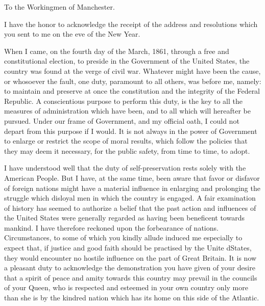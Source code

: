 \documentclass[12pt]{letter}
\date{Executive Mansion, \\ 
	Washington, January, 19, 1863.}
\begin{document}
\begin{letter}{}
\opening{To the Workingmen of Manchester.}

 \marginpar{\textbf{[1]}} I have the honor to acknowledge the receipt of the address and resolutions which you sent to me on the eve of the New Year.

When I came, on the fourth day of the March, 1861, through a free and constitutional election, to preside in the Government of the United States, the country was found at the verge of civil war. Whatever might have been the cause, or whosoever the fault, one duty, paramount to all others, was before me, namely: to maintain and preserve at once the constitution and the integrity of the Federal Republic. A conscientious purpose to perform this duty, is the key to all the measures of administration \marginpar{\textbf{[2]}} which have been, and to all which will hereafter be pursued. Under our frame of Government, and my official oath, I could not depart from this purpose if I would. It is not always in the power of Government to enlarge or restrict the scope of moral results, which follow the policies that they may deem it necessary, for the public safety, from time to time, to adopt.

I have understood well that the duty of self-preservation rests solely with the American People. But I have, at the same time, been aware that favor or disfavor of foreign nations might have a material influence in enlarging and prolonging the struggle which disloyal men in which the country is engaged. A fair examination of history has seemed to authorize a belief that the past action and influences of the United States were generally regarded as having been beneficent towards mankind. I have therefore reckoned upon the forbearance of nations. Circumstances, to some of which you \marginpar{\textbf{[3]}} kindly allude induced me especially to expect that, if justice and good faith should be practised by the Unite dStates, they would encounter no hostile influence on the part of Great Britain. It is now a pleasant duty to acknowledge the demonstration you have given of your desire that a spirit of peace and amity towards this country may prevail in the councils of your Queen, who is respected and esteemed in your own country only more than she is by the kindred nation which has its home on this side of the Atlantic.


\end{letter}
\end{document}
